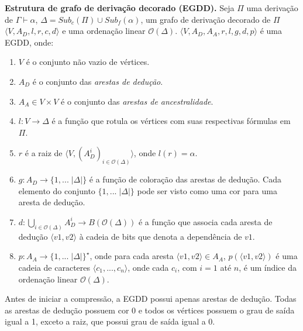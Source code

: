 \vspace{3mm}

\begin{definition}{\textbf{Estrutura de grafo de derivação decorado (EGDD).}}
Seja $\Pi$ uma derivação de $\Gamma \vdash \alpha$, $\Delta = Sub_c(\Pi) \cup Sub_{f}(\alpha)$, um grafo de derivação decorado de $\Pi$ $\langle V, A_D, l, r, c, d \rangle$ e uma ordenação linear $\mathcal{O}(\Delta)$. $\langle V, A_D, A_A, r, l, g, d, p \rangle$ é uma EGDD, onde:

\begin{enumerate}
    \item $V$ é o conjunto não vazio de vértices.
    \item $A_D$ é o conjunto das \textit{arestas de dedução}.
    \item $A_A \in V \times V$ é o conjunto das \textit{arestas de ancestralidade}.
    \item $l: V \rightarrow \Delta$ é a função que rotula os vértices com suas respectivas fórmulas em $\Pi$. 
    \item $r$ é a raiz de $\langle V, (A_{D}^{i})_{i \in \mathcal{O}(\Delta)} \rangle$, onde $l(r) = \alpha$.
    \item $g: A_D \rightarrow \{1, ...\; |\Delta|\}$ é a função de coloração das arestas de dedução. Cada elemento do conjunto $\{1, ...\; |\Delta|\}$ pode ser visto como uma cor para uma aresta de dedução.
    \item $d: \bigcup_{i \in \mathcal{O}(\Delta)} A_{D}^{i} \rightarrow  B(\mathcal{O}(\Delta))$ é a função que associa cada aresta de dedução $\langle v1, v2 \rangle$ à cadeia de bits que denota a dependência de $v1$. 
    \item $p: A_A \rightarrow \{1, ...\; |\Delta|\}^{\star}$, onde para cada aresta $\langle v1, v2 \rangle \in A_A$, $p(\langle v1, v2 \rangle)$ é uma cadeia de caracteres $\langle c_1, ..., c_n \rangle$, onde cada $c_i$, com $i = 1$ até $n$, é um índice da ordenação linear $\mathcal{O}(\Delta)$.
\end{enumerate}

\end{definition}

Antes de iniciar a compressão, a EGDD possui apenas arestas de dedução. Todas as arestas de dedução possuem cor 0 e todos os vértices possuem o grau de saída igual a 1, exceto a raiz, que possui grau de saída igual a 0.

